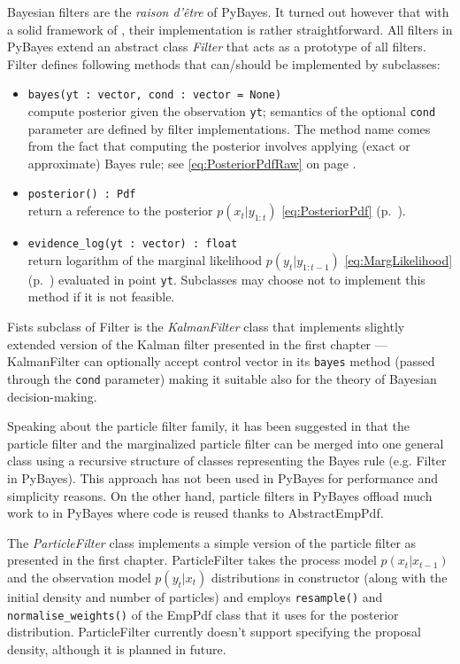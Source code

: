 Bayesian filters are the \emph{raison d'être} of PyBayes. It turned out however that with a solid
framework of {\pdfs}, their implementation is rather straightforward. All filters in PyBayes extend
an abstract class \emph{Filter} that acts as a prototype of all filters. Filter defines following
methods that can/should be implemented by subclasses:
\begin{itemize}
	\item \verb|bayes(yt : vector, cond : vector = None)| \\
		compute posterior {\pdf} given
		the observation \verb|yt|; semantics of the optional \verb|cond| parameter are defined
		by filter implementations. The method name comes from the fact that computing the posterior
		{\pdf} involves applying (exact or approximate) Bayes rule; see \eqref{eq:PosteriorPdfRaw}
		on page \pageref{eq:PosteriorPdfRaw}.
	\item \verb|posterior() : Pdf| \\
		return a reference to the posterior {\pdf} \(p(x_t | y_{1:t})\) \eqref{eq:PosteriorPdf}
		(p.~\pageref{eq:PosteriorPdf}).
	\item \verb|evidence_log(yt : vector) : float| \\
		return logarithm of the marginal likelihood \(p(y_t | y_{1:t-1})\) \eqref{eq:MargLikelihood}
		(p.~\pageref{eq:MargLikelihood}) evaluated in point \verb|yt|. Subclasses may choose not to
		implement this method if it is not feasible.
\end{itemize}
Fists subclass of Filter is the \emph{KalmanFilter} class that implements slightly extended version
of the Kalman filter presented in the first chapter --- KalmanFilter can optionally accept control
vector in its \verb|bayes| method (passed through the \verb|cond| parameter) making it suitable also
for the theory of Bayesian decision-making.

Speaking about the particle filter family, it has been suggested in \cite{Smi:10} that the particle
filter and the marginalized particle filter can be merged into one general class using a recursive
structure of classes representing the Bayes rule (e.g. Filter in PyBayes). This approach has not
been used in PyBayes for performance and simplicity reasons. On the other hand, particle filters in
PyBayes offload much work to {\pdfs} in PyBayes where code is reused thanks to AbstractEmpPdf.

The \emph{ParticleFilter} class implements a simple version of the particle filter as presented in
the first chapter. ParticleFilter takes the process model \(p(x_t|x_{t-1})\) and the observation
model \(p(y_t|x_t)\) distributions in constructor (along with the initial density and number of
particles) and employs \verb|resample()| and \verb|normalise_weights()| of the EmpPdf class that it
uses for the posterior distribution. ParticleFilter currently doesn't support specifying the
proposal density, although it is planned in future.

